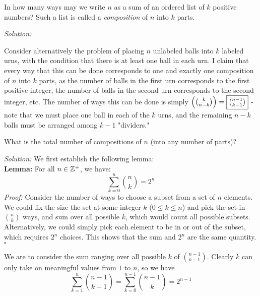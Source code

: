 \documentclass[12pt]{scrartcl}
\newenvironment{problem}[2][Problem]{\begin{trivlist}
\item[\hskip \labelsep {\bfseries #1}\hskip \labelsep {\bfseries #2.}]}{\end{trivlist}}
\newenvironment{solution}
    {\emph{Solution:}
    }
    {
    \qedhere
    }
\begin{document}
\thispagestyle{fancy}
\begin{problem}{1} 
In how many ways may we write $n$ as a sum of an ordered list of $k$ positive numbers? Such a list is called a \textit{composition} of $n$ into $k$ parts. 
\end{problem}

\begin{solution}
Consider alternatively the problem of placing $n$ unlabeled balls into $k$ labeled urns, with the condition that there is at least one ball in each urn. I claim that every way that this can be done corresponds to one and exactly one composition of $n$ into $k$ parts, as the number of balls in the first urn corresponds to the first positive integer, the number of balls in the second urn corresponds to the second integer, etc. The number of ways this can be done is simply $\left(\binom{k}{n-k}\right) = \boxed{\tbinom{n-1}{k-1}}$ - note that we must place one ball in each of the $k$ urns, and the remaining $n-k$ balls must be arranged among $k-1$ "dividers." 
\end{solution}


\begin{problem}{2}
What is the total number of compositions of $n$ (into any number of parts)? 
\end{problem}

\begin{solution} We first establish the following lemma: \\
\textbf{Lemma: } For all $n \in \mathbb Z^+$, we have: 
\[
	\sum_{k=0}^n \binom{n}{k} = 2^n 
\]
\indent \textit{Proof: } Consider the number of ways to choose a subset from a set of $n$ elements. We could fix the size the set at some integer $k$ ($0 \leq k \leq n$) and pick the set in $\binom{n}{k}$ ways, and sum over all possible $k$, which would count all possible subsets. Alternatively, we could simply pick each element to be in or out of the subset, which requires $2^n$ choices. This shows that the sum and $2^n$ are the same quantity. $\square$

We are to consider the sum ranging over all possible $k$ of $\binom{n-1}{k-1}$. Clearly $k$ can only take on meaningful values from $1$ to $n$, so we have
\[
	\sum_{k=1}^n \binom{n-1}{k-1} = \sum_{k=0}^{n-1} \binom{n-1}{k} = \boxed{2^{n-1}}
\]
\end{solution}

\end{document}
